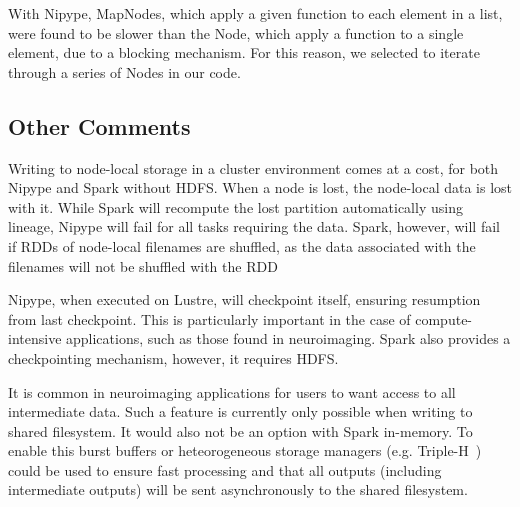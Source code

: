 \documentclass{IEEEtran}
\newcommand{\todo}[1]{\marginpar{\parbox{18mm}{\flushleft\tiny\color{red}\textbf{TODO}:
      #1}}}
\begin{document}
With Nipype, MapNodes, which apply a given function to each element in a list, 
were found to be slower than the Node, which apply a function to a single element,
due to a blocking mechanism. For this reason, we selected to iterate through a 
series of Nodes in our code.

\subsection{Other Comments}

Writing to node-local storage in a cluster environment comes at a cost, for both
Nipype and Spark without HDFS. When a node is lost, the node-local data is lost
with it. While Spark will recompute the lost partition automatically using lineage, 
Nipype will fail for all tasks requiring the data. Spark, however, will fail if 
RDDs of node-local filenames are shuffled, as the data associated with the filenames
will not be shuffled with the RDD

Nipype, when executed on Lustre, will checkpoint itself, ensuring resumption from
last checkpoint. This is particularly important in the case of compute-intensive 
applications, such as those found in neuroimaging. Spark also provides a checkpointing
mechanism, however, it requires HDFS.

It is common in neuroimaging applications for users to want access to all intermediate
data. Such a feature is currently only possible when writing to shared filesystem. 
It would also not be an option with Spark in-memory. To enable this burst buffers or 
heteorogeneous storage managers (e.g. Triple-H~\cite{tripleH}) could be used to ensure
fast processing and that all outputs (including intermediate outputs) will be 
sent asynchronously to the shared filesystem. \todo{double check triple-H}



\end{document}
